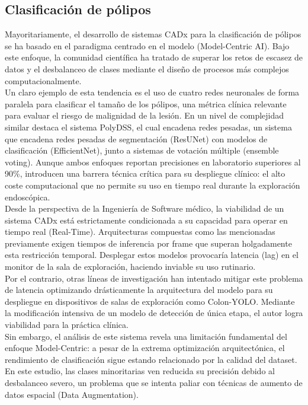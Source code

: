 ﻿\documentclass[10pt,a4paper,twocolumn,twoside]{article}
\begin{document}
\subsection{Clasificación de pólipos}
Mayoritariamente, el desarrollo de sistemas CADx para la clasificación de pólipos se ha basado en el paradigma centrado en el modelo (Model-Centric AI). Bajo este enfoque, la comunidad científica ha tratado de superar los retos de escasez de datos y el desbalanceo de clases mediante el diseño de procesos más complejos computacionalmente.\\
Un claro ejemplo de esta tendencia es el uso de cuatro redes neuronales de forma paralela para clasificar el tamaño de los pólipos\cite{haldar2023xgboosted}, una métrica clínica relevante para evaluar el riesgo de malignidad de la lesión. En un nivel de complejidad similar destaca el sistema PolyDSS, el cual encadena redes pesadas\cite{badawy2024polydss}, un sistema que encadena redes pesadas de segmentación (ResUNet) con modelos de clasificación (EfficientNet), junto a sistemas de votación múltiple (ensemble voting). Aunque ambos enfoques reportan precisiones en laboratorio superiores al 90\%, introducen una barrera técnica crítica para su despliegue clínico: el alto coste computacional que no permite su uso en tiempo real durante la exploración endoscópica.\\
Desde la perspectiva de la Ingeniería de Software médico, la viabilidad de un sistema CADx está estrictamente condicionada a su capacidad para operar en tiempo real (Real-Time). Arquitecturas compuestas como las mencionadas previamente exigen tiempos de inferencia por frame que superan holgadamente esta restricción temporal. Desplegar estos modelos provocaría latencia (lag) en el monitor de la sala de exploración, haciendo inviable su uso rutinario.\\
Por el contrario, otras líneas de investigación han intentado mitigar este problema de latencia optimizando drásticamente la arquitectura del modelo para su despliegue en dispositivos de salas de exploración como Colon-YOLO\cite{colonyolo2025}. Mediante la modificación intensiva de un modelo de detección de única etapa, el autor logra viabilidad para la práctica clínica.\\
Sin embargo, el análisis de este sistema revela una limitación fundamental del enfoque Model-Centric: a pesar de la extrema optimización arquitectónica, el rendimiento de clasificación sigue estando relacionado por la calidad del dataset. En este estudio, las clases minoritarias ven reducida su precisión debido al desbalanceo severo, un problema que se intenta paliar con técnicas de aumento de datos espacial (Data Augmentation).
\end{document}
